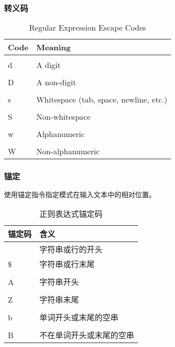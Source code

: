 \subsubsection{转义码}
\begin{table}
    \centering
    \caption{Regular Expression Escape Codes}
    \label{tbl1-1}
    \begin{tabular}{ll}
        \hline
        Code & Meaning \\
        \hline
        \\d   & A digit                                \\
        \\D   & A non-digit                            \\
        \\s   & Whitespace (tab, space, newline, etc.) \\
        \\S   & Non-whitespace                         \\
        \\w   & Alphanumeric                           \\
        \\W   & Non-alphanumeric                       \\
        \hline
    \end{tabular}

\end{table}
\subsubsection{锚定}
使用锚定指令指定模式在输入文本中的相对位置。
\begin{table}
    \centering
    \caption{正则表达式锚定码}
    \label{tbl1-2}
    \begin{tabular}{ll}
        \hline
        锚定码      & 含义       \\
        \hline
        $\hat{}$ & 字符串或行的开头 \\
        \$       & 字符串或行末尾  \\
        \\A       & 字符串开头        \\
        \\Z       & 字符串末尾        \\
        \\b       & 单词开头或末尾的空串   \\
        \\B       & 不在单词开头或末尾的空串 \\
        \hline
    \end{tabular}

\end{table}